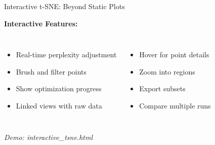 \documentclass[aspectratio=169]{beamer}
\begin{document}
\begin{frame}{Interactive t-SNE: Beyond Static Plots}
\begin{center}
\end{center}

\vspace{0.2cm}
\textbf{Interactive Features:}

\begin{columns}
\begin{itemize}
\item Real-time perplexity adjustment
\item Brush and filter points
\item Show optimization progress
\item Linked views with raw data
\end{itemize}

\begin{itemize}
\item Hover for point details
\item Zoom into regions
\item Export subsets
\item Compare multiple runs
\end{itemize}
\end{columns}

\vspace{0.1cm}
\textit{Demo: interactive\_tsne.html}
\end{frame}
\end{document}

